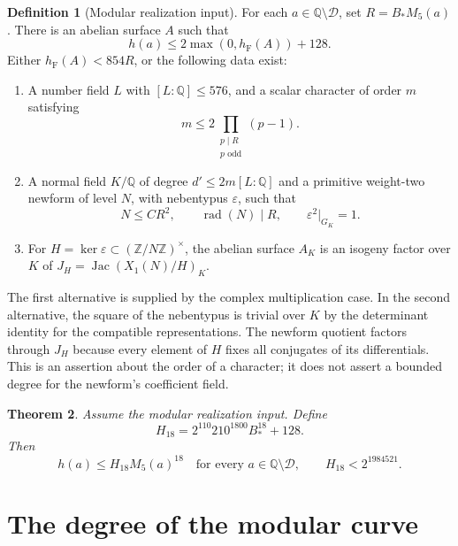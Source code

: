 \documentclass[11pt,a4paper]{article}
\newtheorem{theorem}{Theorem}[section]
\theoremstyle{definition}
\newtheorem{definition}[theorem]{Definition}
\newcommand{\Q}{\mathbb Q}
\newcommand{\Z}{\mathbb Z}
\newcommand{\hF}{h_{\mathrm F}}
\newcommand{\rad}{\operatorname{rad}}
\newcommand{\Jac}{\operatorname{Jac}}
\begin{document}
\begin{definition}[Modular realization input]\label{def:input}
For each $a\in\Q\setminus\mathcal D$, set $R=B_*M_5(a)$.
There is an abelian surface $A$ such that
\begin{equation}\label{eq:geometric}
 h(a)\le2\max(0,\hF(A))+128.
\end{equation}
Either $\hF(A)<854R$, or the following data exist:
\begin{enumerate}
\item A number field $L$ with $[L:\Q]\le576$, and a scalar
character of order $m$ satisfying
\[
 m\le2\prod_{\substack{p\mid R\\p\text{ odd}}}(p-1).
\]
\item A normal field $K/\Q$ of degree
$d'\le2m[L:\Q]$ and a primitive weight-two newform of level $N$,
with nebentypus $\varepsilon$, such that
\[
 N\le CR^2,\qquad \rad(N)\mid R,
 \qquad\varepsilon^2|_{G_K}=1.
\]
\item For $H=\ker\varepsilon\subset(\Z/N\Z)^\times$, the
abelian surface $A_K$ is an isogeny factor over $K$ of
$J_H=\Jac(X_1(N)/H)_K$.
\end{enumerate}
\end{definition}

The first alternative is supplied by the complex multiplication
case. In the second alternative, the square of the nebentypus is
trivial over $K$ by the determinant identity for the compatible
representations. The newform quotient factors through $J_H$ because
every element of $H$ fixes all conjugates of its differentials.
This is an assertion about the order of a character; it does not
assert a bounded degree for the newform's coefficient field.

\begin{theorem}\label{thm:contact-height}
Assume the modular realization input. Define
\[
 H_{18}=2^{110}210^{1800}B_*^{18}+128.
\]
Then
\[
 h(a)\le H_{18}M_5(a)^{18}
 \quad\text{for every }a\in\Q\setminus\mathcal D,
 \qquad H_{18}<2^{1984521}.
\]
\end{theorem}

\section{The degree of the modular curve}
\end{document}
